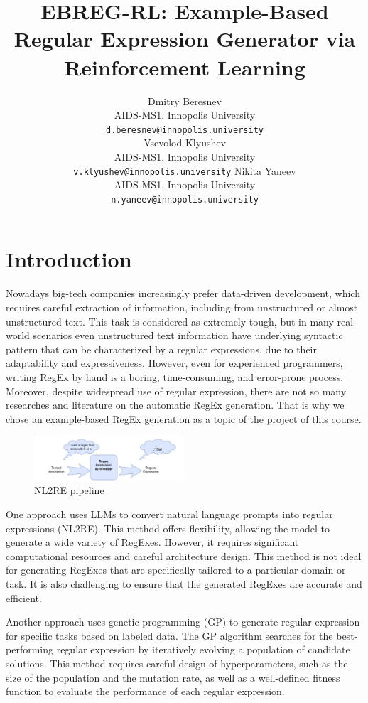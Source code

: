 \documentclass{article}
\title{EBREG-RL: Example-Based Regular Expression Generator
via Reinforcement Learning}
\date{} 					%
\author{
  \hspace{1mm}Dmitry Beresnev\\
	AIDS-MS1, Innopolis University\\
	\texttt{d.beresnev@innopolis.university}\\
	\And{}
  \hspace{1mm}Vsevolod Klyushev\\
	AIDS-MS1, Innopolis University\\
	\texttt{v.klyushev@innopolis.university}	\And{}
  \hspace{1mm}Nikita Yaneev\\
	AIDS-MS1, Innopolis University\\
	\texttt{n.yaneev@innopolis.university}
}
\begin{document}
\maketitle


\section{Introduction}

Nowadays big-tech companies increasingly prefer data-driven development, which requires careful extraction of 
information, including from unstructured or almost unstructured text. This task is considered as extremely tough, 
but in many real-world scenarios even unstructured text information have underlying syntactic pattern that can be 
characterized by a regular expressions, due to their adaptability and expressiveness.
However, even for experienced programmers, writing RegEx by hand is a boring, time-consuming, and error-prone 
process. Moreover, despite widespread use of regular expression, there are not so many researches and literature on 
the automatic RegEx generation. That is why we chose an example-based RegEx generation as a topic of the project of 
this course.

\begin{figure}[H]
  \centering
    \includegraphics[width=0.5\textwidth]{./pictures/approach1.png}
    \caption[NL2RE pipeline]{NL2RE pipeline}\label{fig:NL2RE}
\end{figure}

One approach \cite{Zhong2018, Tariq2024} uses LLMs to convert natural language prompts into regular expressions (NL2RE). 
This method offers flexibility, allowing the model to generate a wide variety of RegExes. 
However, it requires significant computational resources and careful architecture design. 
This method is not ideal for generating RegExes that are specifically tailored to a particular domain or task. 
It is also challenging to ensure that the generated RegExes are accurate and efficient.

Another approach \cite{Bartoli2016, Bartoli2018} uses genetic programming (GP) to generate regular expression for specific tasks based on labeled 
data. The GP algorithm searches for the best-performing regular expression by iteratively evolving a population of 
candidate solutions. This method requires careful design of hyperparameters, such as the size of the population and 
the mutation rate, as well as a well-defined fitness function to evaluate the performance of each regular expression.
\end{document}
